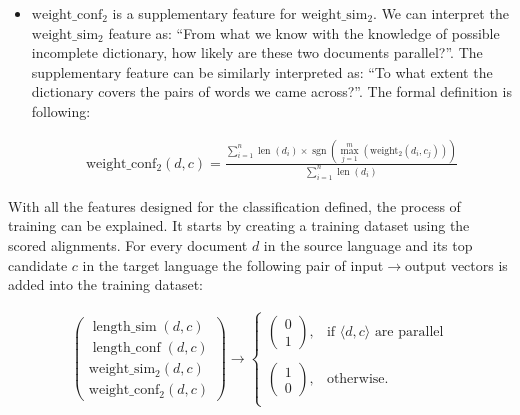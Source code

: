 \begin{itemize}[resume]
	\item $\operatorname{weight\_conf_2}$ is a supplementary feature for $\operatorname{weight\_sim_2}$. We can interpret the $\operatorname{weight\_sim_2}$ feature as: ``From what we know with the knowledge of possible incomplete dictionary, how likely are these two documents parallel?''. The supplementary feature can be similarly interpreted as: ``To what extent the dictionary covers the pairs of words we came across?''. The formal definition is following:
		
	\begin{align*}
	\operatorname{weight\_conf_2}(d, c)=\frac{\sum\limits_{i=1}^{n} \operatorname{len}(d_i) \times \operatorname{sgn}(\max\limits_{j=1}^{m}\left(\operatorname{weight_2}(d_i, c_j)\right))}{\sum\limits_{i=1}^{n} \operatorname{len}(d_i)}
	\end{align*}
\end{itemize}
	
With all the features designed for the classification defined, the process of training can be explained. It starts by creating a training dataset using the scored alignments. For every document $d$ in the source language and its top candidate $c$ in the target language the following pair of input$\rightarrow$output vectors is added into the training dataset:

\begin{align*}
\begin{pmatrix}
\operatorname{length\_sim}(d, c) \\
\operatorname{length\_conf}(d, c) \\
\operatorname{weight\_sim_2}(d, c) \\
\operatorname{weight\_conf_2}(d, c)
\end{pmatrix} \rightarrow \begin{cases}
\begin{pmatrix} 0 \\ 1 \end{pmatrix}, & \text{if } \langle d,c \rangle \text{ are parallel} \\\\
\begin{pmatrix} 1 \\ 0 \end{pmatrix}, & \text{otherwise.} \\
\end{cases}
\end{align*}

